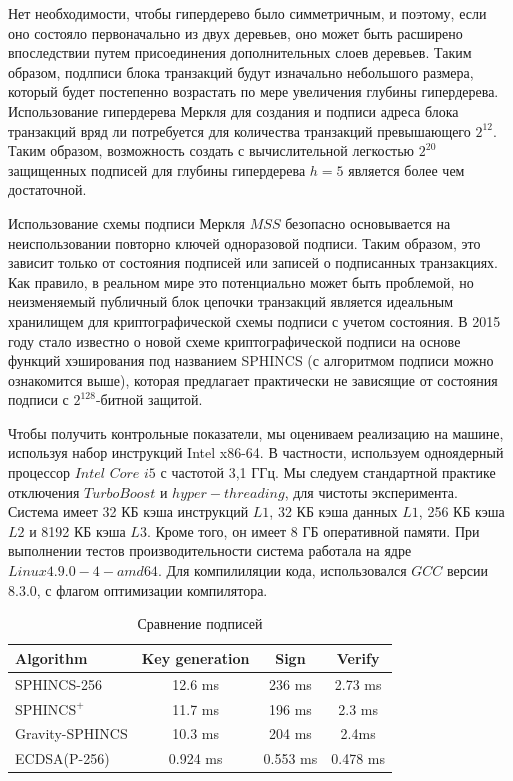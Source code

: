 \documentclass[a4paper, 14pt]{extarticle}
\begin{document}
Нет необходимости, чтобы гипердерево было симметричным, и поэтому, если оно состояло первоначально из двух деревьев, оно может быть расширено впоследствии путем присоединения дополнительных слоев деревьев. Таким образом, подлписи блока транзакций будут изначально небольшого размера, который будет постепенно возрастать по мере увеличения глубины гипердерева. Использование гипердерева Меркля для создания и подписи адреса блока транзакций вряд ли потребуется для количества транзакций превышающего $2^{12}$. Таким образом, возможность создать с вычислительной легкостью $2^{20}$ защищенных подписей для глубины гипердерева $h = 5$ является более чем достаточной.

Использование схемы подписи Меркля $MSS$ безопасно основывается на неиспользовании повторно ключей одноразовой подписи. Таким образом, это зависит только от состояния подписей или записей о подписанных транзакциях. Как правило, в реальном мире это потенциально может быть проблемой, но неизменяемый публичный блок цепочки транзакций является идеальным хранилищем для криптографической схемы подписи с учетом состояния. В 2015 году стало известно о новой схеме криптографической подписи на основе функций хэширования под названием SPHINCS (с алгоритмом подписи можно ознакомится выше), которая предлагает практически не зависящие от состояния подписи с $2^{128}$-битной защитой.

Чтобы получить контрольные показатели, мы оцениваем реализацию на машине, используя набор инструкций Intel x86-64. В частности, используем одноядерный процессор $Intel$ $Core$ $i5$ с частотой 3,1 ГГц. Мы следуем стандартной практике отключения $TurboBoost$ и $hyper-threading$, для чистоты эксперимента. Система имеет 32 КБ кэша инструкций $L1$, 32 КБ кэша данных $L1$, 256 КБ кэша $L2$ и 8192 КБ кэша $L3$. Кроме того, он имеет 8 ГБ оперативной памяти. При выполнении тестов производительности система работала на ядре $Linux 4.9.0-4-amd64$. Для компилиляции кода, использовался $GCC$ версии 8.3.0, с флагом оптимизации компилятора.
\newline

\begin{table}[h!]
    \begin{center}
      \caption{Сравнение подписей}
      \label{tab:table1}
      \begin{tabular}{l|c|c|c}
        \textbf{Algorithm} & \textbf{Key generation} & \textbf{Sign} & \textbf{Verify}\\
        \hline
        SPHINCS-256 & 12.6 ms & 236 ms & 2.73 ms\\
        $\text{SPHINCS}^+$ & 11.7 ms & 196 ms & 2.3 ms\\
        Gravity-SPHINCS & 10.3 ms & 204 ms & 2.4ms\\
        ECDSA(P-256) & 0.924 ms & 0.553 ms & 0.478 ms\\
      \end{tabular}
    \end{center}
  \end{table}
\newpage
\end{document}
